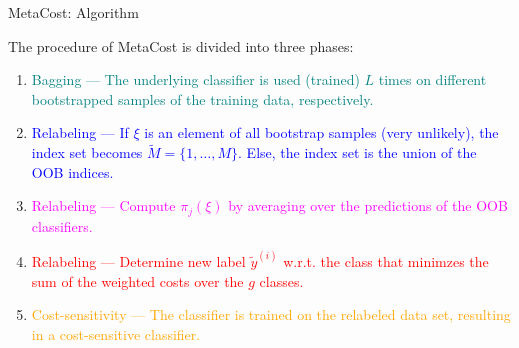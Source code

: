 \documentclass[11pt,compress,t,notes=noshow, xcolor=table]{beamer}
\begin{document}
\begin{vbframe}{MetaCost: Algorithm}
	
	\scriptsize{
%		
 	The procedure of MetaCost is divided into three phases:
		\begin{minipage}{0.53\textwidth} 
%				
				\begin{enumerate}
%					
					\scriptsize
					\item \textcolor{teal}{Bagging --- The underlying classifier is used (trained) $L$ times on different bootstrapped samples of the training data, respectively.}
%					

     				\item \textcolor{blue}{Relabeling --- If $\xi$ is an element of all bootstrap samples (very unlikely), the index set becomes $\tilde M = \{1,\ldots,M\}$. Else, the index set is the union of the OOB indices.}

                        \item \textcolor{magenta}{ Relabeling --- Compute $\pi_j(\xi)$ by averaging over the predictions of the OOB classifiers.}

                        \item \textcolor{red}{ Relabeling --- Determine new label $\tilde y^{(i)}$ w.r.t. the class that minimzes the sum of the weighted costs over the $g$ classes.}
%					
					\item \textcolor{orange}{Cost-sensitivity ---  The classifier is trained on the relabeled data set, resulting in a cost-sensitive classifier.}
%					
				\end{enumerate}
%

%		
		
		\end{minipage}
		\begin{minipage}{0.45\textwidth} 
			\begin{algorithmic}
				

\end{algorithmic}
\end{minipage}}
\end{vbframe}
\end{document}
